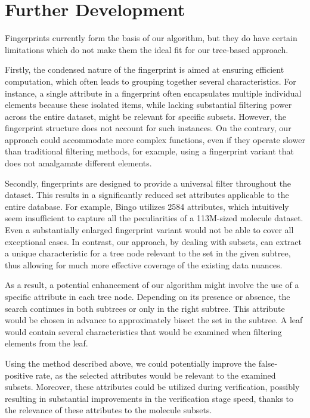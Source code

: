 \section{Further Development}

Fingerprints currently form the basis of our algorithm, but they do have certain limitations which do not make them the ideal fit for our tree-based approach.

Firstly, the condensed nature of the fingerprint is aimed at ensuring efficient computation, which often leads to grouping together several characteristics. 
For instance, a single attribute in a fingerprint often encapsulates multiple individual elements because these isolated items, while lacking substantial 
filtering power across the entire dataset, might be relevant for specific subsets. However, the fingerprint structure does not account for such instances. 
On the contrary, our approach could accommodate more complex functions, even if they operate slower than traditional filtering methods, for example, using 
a fingerprint variant that does not amalgamate different elements.

Secondly, fingerprints are designed to provide a universal filter throughout the dataset. This results in a significantly reduced set  
attributes applicable to the entire database. For example, Bingo utilizes 2584 attributes, which intuitively seem insufficient to capture all the 
peculiarities of a 113M-sized molecule dataset. Even a substantially enlarged fingerprint variant would not be able to cover all exceptional cases. 
In contrast, our approach, by dealing with subsets, can extract a unique characteristic for a tree node relevant to the set in the given subtree, 
thus allowing for much more effective coverage of the existing data nuances.

As a result, a potential enhancement of our algorithm might involve the use of a specific attribute in each tree node. Depending on its presence or absence, 
the search continues in both subtrees or only in the right subtree. This attribute would be chosen in advance to approximately bisect the set in the subtree. 
A leaf would contain several characteristics that would be examined when filtering elements from the leaf.

Using the method described above, we could potentially improve the false-positive rate, as the selected attributes would be relevant to the examined subsets. 
Moreover, these attributes could be utilized during verification, possibly resulting in substantial improvements in the verification stage speed, thanks to the 
relevance of these attributes to the molecule subsets.

